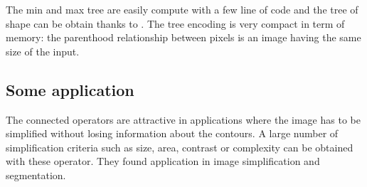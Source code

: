 The min and max tree are easily compute with a few line of code \cite{berger.07.icip} and the tree of shape can be obtain thanks to \cite{geraud.13.ismm}. The tree encoding is very compact in term of memory: the parenthood relationship between pixels is an image having the same size of the input. 

\subsection{Some application}
The connected operators are attractive in applications where the image has to be simplified without losing information about the contours. A large number of simplification criteria such as size, area, contrast or complexity can be obtained with these operator. They found application in image simplification and segmentation.